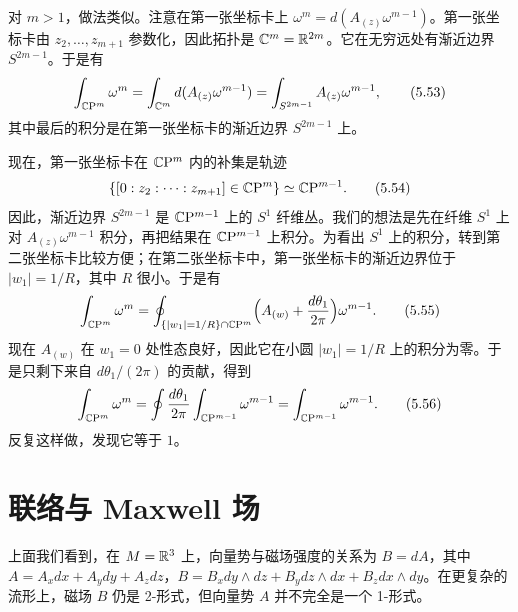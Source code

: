 对 $m>1$，做法类似。注意在第一张坐标卡上 $\omega^m=d(A_{(z)}\omega^{m-1})$。第一张坐标卡由 $z_2,\dots,z_{m+1}$ 参数化，因此拓扑是 $\mathbb{C}^m=\mathbb{R}^{2m}$。它在无穷远处有渐近边界 $S^{2m-1}$。于是有
\begin{equation}
  \int_{\mathbb{C}\mathrm{P}^m}\omega^m=\int_{\mathbb{C}^m}d(A_{(z)}\omega^{m-1})=\int_{S^{2m-1}}A_{(z)}\omega^{m-1},
  \tag{5.53}
\end{equation}
其中最后的积分是在第一张坐标卡的渐近边界 $S^{2m-1}$ 上。

现在，第一张坐标卡在 $\mathbb{C}\mathrm{P}^m$ 内的补集是轨迹
\begin{equation}
  \{[0:z_2:\cdots:z_{m+1}]\in\mathbb{C}\mathrm{P}^m\}\simeq\mathbb{C}\mathrm{P}^{m-1}.
  \tag{5.54}
\end{equation}
因此，渐近边界 $S^{2m-1}$ 是 $\mathbb{C}\mathrm{P}^{m-1}$ 上的 $S^1$ 纤维丛。我们的想法是先在纤维 $S^1$ 上对 $A_{(z)}\omega^{m-1}$ 积分，再把结果在 $\mathbb{C}\mathrm{P}^{m-1}$ 上积分。为看出 $S^1$ 上的积分，转到第二张坐标卡比较方便；在第二张坐标卡中，第一张坐标卡的渐近边界位于 $|w_1|=1/R$，其中 $R$ 很小。于是有
\begin{equation}
  \int_{\mathbb{C}\mathrm{P}^m}\omega^m=\oint_{\{|w_1|=1/R\}\cap\mathbb{C}\mathrm{P}^m}\Bigl(A_{(w)}+\frac{d\theta_1}{2\pi}\Bigr)\omega^{m-1}.
  \tag{5.55}
\end{equation}
现在 $A_{(w)}$ 在 $w_1=0$ 处性态良好，因此它在小圆 $|w_1|=1/R$ 上的积分为零。于是只剩下来自 $d\theta_1/(2\pi)$ 的贡献，得到
\begin{equation}
  \int_{\mathbb{C}\mathrm{P}^m}\omega^m=\oint\frac{d\theta_1}{2\pi}\int_{\mathbb{C}\mathrm{P}^{m-1}}\omega^{m-1}
  =\int_{\mathbb{C}\mathrm{P}^{m-1}}\omega^{m-1}.
  \tag{5.56}
\end{equation}
反复这样做，发现它等于 $1$。


\section{联络与 Maxwell 场}

上面我们看到，在 $M=\mathbb{R}^3$ 上，向量势与磁场强度的关系为 $B=dA$，其中 $A=A_xdx+A_ydy+A_zdz$，$B=B_xdy\wedge dz+B_ydz\wedge dx+B_zdx\wedge dy$。在更复杂的流形上，磁场 $B$ 仍是 2-形式，但向量势 $A$ 并不完全是一个 1-形式。

